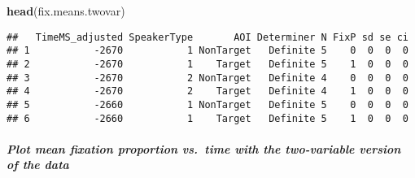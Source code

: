 \documentclass[
]{article}
\newenvironment{Shaded}{\begin{snugshade}}{\end{snugshade}}
\newcommand{\FunctionTok}[1]{\textcolor[rgb]{0.13,0.29,0.53}{\textbf{#1}}}
\newcommand{\NormalTok}[1]{#1}
\begin{document}
\begin{Shaded}
\begin{Highlighting}[]
\FunctionTok{head}\NormalTok{(fix.means.twovar)}
\end{Highlighting}
\end{Shaded}

\begin{verbatim}
##   TimeMS_adjusted SpeakerType       AOI Determiner N FixP sd se ci
## 1           -2670           1 NonTarget   Definite 5    0  0  0  0
## 2           -2670           1    Target   Definite 5    1  0  0  0
## 3           -2670           2 NonTarget   Definite 4    0  0  0  0
## 4           -2670           2    Target   Definite 4    1  0  0  0
## 5           -2660           1 NonTarget   Definite 5    0  0  0  0
## 6           -2660           1    Target   Definite 5    1  0  0  0
\end{verbatim}

\subparagraph{Plot mean fixation proportion vs.~time with the
two-variable version of the
data}\label{plot-mean-fixation-proportion-vs.-time-with-the-two-variable-version-of-the-data}
\end{document}
